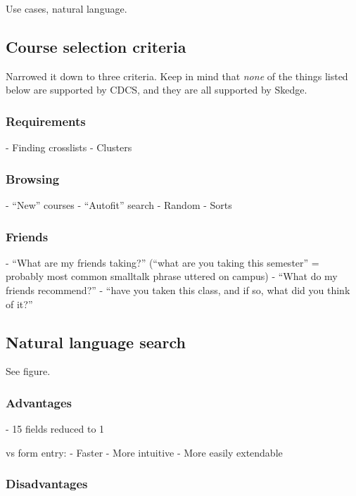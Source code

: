 Use cases, natural language.

\subsection{Course selection criteria}

Narrowed it down to three criteria. Keep in mind that \emph{none} of the things listed below are supported by CDCS, and they are all supported by Skedge.

  \subsubsection{Requirements}

  - Finding crosslists
  - Clusters

  \subsubsection{Browsing}

  - ``New'' courses
  - ``Autofit'' search
  - Random
  - Sorts

  \subsubsection{Friends}

  - ``What are my friends taking?'' (``what are you taking this semester'' = probably most common smalltalk phrase uttered on campus)
  - ``What do my friends recommend?'' - ``have you taken this class, and if so, what did you think of it?''

\subsection{Natural language search}


See figure.

  \subsubsection{Advantages}

  - 15 fields reduced to 1

  vs form entry:
  - Faster
  - More intuitive
  - More easily extendable

  \subsubsection{Disadvantages}

